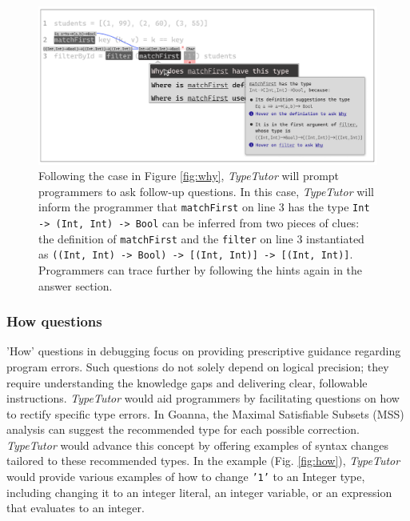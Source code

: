 \begin{figure}[hbt]
  \includegraphics[width=\linewidth]{FollowUp}
  \caption[An example of \textit{TypeTutor} providing further explanation based on previous response (follow-up questions)]{
    \label{fig:follow-up}
     Following the case in Figure \ref{fig:why}, \textit{TypeTutor} will prompt programmers to ask follow-up questions. In this case, \textit{TypeTutor} will inform the programmer that \texttt{matchFirst} on line 3 has the type \texttt{Int -> (Int, Int) -> Bool} can be inferred from two pieces of clues:  the definition of \texttt{matchFirst} and the \texttt{filter} on line 3 instantiated as \texttt{((Int, Int) -> Bool) -> [(Int, Int)] -> [(Int, Int)]}. Programmers can trace further by following the hints again in the answer section.
    }
\end{figure}

\subsubsection*{How questions}

'How' questions in debugging focus on providing prescriptive guidance regarding program errors. Such questions do not solely depend on logical precision; they require understanding the knowledge gaps and delivering clear, followable instructions. \textit{TypeTutor} would aid programmers by facilitating questions on how to rectify specific type errors. In Goanna, the Maximal Satisfiable Subsets (MSS) analysis can suggest the recommended type for each possible correction. \textit{TypeTutor} would advance this concept by offering examples of syntax changes tailored to these recommended types. In the example (Fig. \ref{fig:how}), \textit{TypeTutor} would provide various examples of how to change \texttt{'1'} to an Integer type, including changing it to an integer literal, an integer variable, or an expression that evaluates to an integer. 



